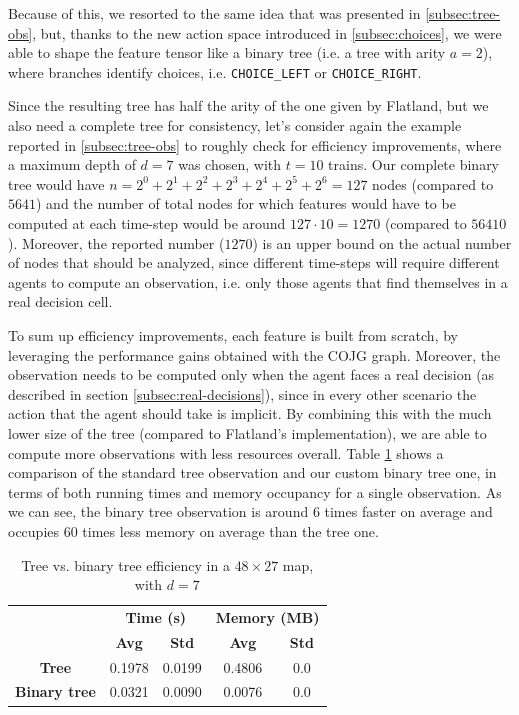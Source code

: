 \documentclass[a4paper,10pt]{report}
\begin{document}
Because of this, we resorted to the same idea that was presented in \ref{subsec:tree-obs}, but, thanks to the new action space introduced in \ref{subsec:choices}, we were able to shape the feature tensor like a binary tree (i.e. a tree with arity $a=2$), where branches identify choices, i.e. \texttt{CHOICE_LEFT} or \texttt{CHOICE_RIGHT}.

Since the resulting tree has half the arity of the one given by Flatland, but we also need a complete tree for consistency, let's consider again the example reported in \ref{subsec:tree-obs} to roughly check for efficiency improvements, where a maximum depth of $d=7$ was chosen, with $t=10$ trains. Our complete binary tree would have $n=2^0+2^1+2^2+2^3+2^4+2^5+2^6=\num{127}$ nodes (compared to $\num{5641}$) and the number of total nodes for which features would have to be computed at each time-step would be around $\num{127}\cdot 10=\num{1270}$ (compared to $\num{56410}$). Moreover, the reported number ($\num{1270}$) is an upper bound on the actual number of nodes that should be analyzed, since different time-steps will require different agents to compute an observation, i.e. only those agents that find themselves in a real decision cell.

To sum up efficiency improvements, each feature is built from scratch, by leveraging the performance gains obtained with the COJG graph. Moreover, the observation needs to be computed only when the agent faces a real decision (as described in section \ref{subsec:real-decisions}), since in every other scenario the action that the agent should take is implicit. By combining this with the much lower size of the tree (compared to Flatland's implementation), we are able to compute more observations with less resources overall. Table \ref{table:tree-bt-48x27} shows a comparison of the standard tree observation and our custom binary tree one, in terms of both running times and memory occupancy for a single observation. As we can see, the binary tree observation is around $6$ times faster on average and occupies $60$ times less memory on average than the tree one.

\begin{table}[h]
	\center
	\begin{tabular}{||c c c c c||}
		\hline
					& \multicolumn{2}{c}{\textbf{Time (s)}} & \multicolumn{2}{c||}{\textbf{Memory (MB)}} \\  [0.5ex]
					& \textbf{Avg}         & \textbf{Std}        & \textbf{Avg}          & \textbf{Std} \\  [0.5ex]
		\hline\hline
		\textbf{Tree} & 0.1978 & 0.0199 & 0.4806 & 0.0 \\
		\hline
		\textbf{Binary tree} & 0.0321 & 0.0090 & 0.0076 & 0.0 \\
		\hline       
	\end{tabular}
	\caption{Tree vs. binary tree efficiency in a $48\times 27$ map, with $d=7$}
	\label{table:tree-bt-48x27}
\end{table}
\end{document}
